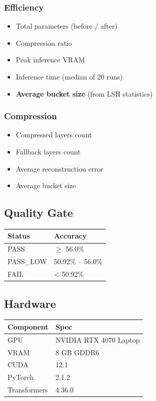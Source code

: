 \subsubsection{Efficiency}
\begin{itemize}
\item Total parameters (before / after)
\item Compression ratio
\item Peak inference VRAM
\item Inference time (median of 20 runs)
\item \textbf{Average bucket size} (from LSH statistics)

\end{itemize}
\subsubsection{Compression}
\begin{itemize}
\item Compressed layers count
\item Fallback layers count
\item Average reconstruction error
\item Average bucket size

\end{itemize}
\subsection{Quality Gate}

\begin{table}[H]
\centering
\small
\begin{tabular}{ll}
\toprule
\textbf{Status} & \textbf{Accuracy} \\
\midrule
PASS & $\ge$ 56.0\% \\
PASS\_LOW & 50.92\% -- 56.0\% \\
FAIL & \textless{} 50.92\% \\
\bottomrule
\end{tabular}
\end{table}

\subsection{Hardware}

\begin{table}[H]
\centering
\small
\begin{tabular}{ll}
\toprule
\textbf{Component} & \textbf{Spec} \\
\midrule
GPU & NVIDIA RTX 4070 Laptop \\
VRAM & 8 GB GDDR6 \\
CUDA & 12.1 \\
PyTorch & 2.1.2 \\
Transformers & 4.36.0 \\
\bottomrule
\end{tabular}
\end{table}

